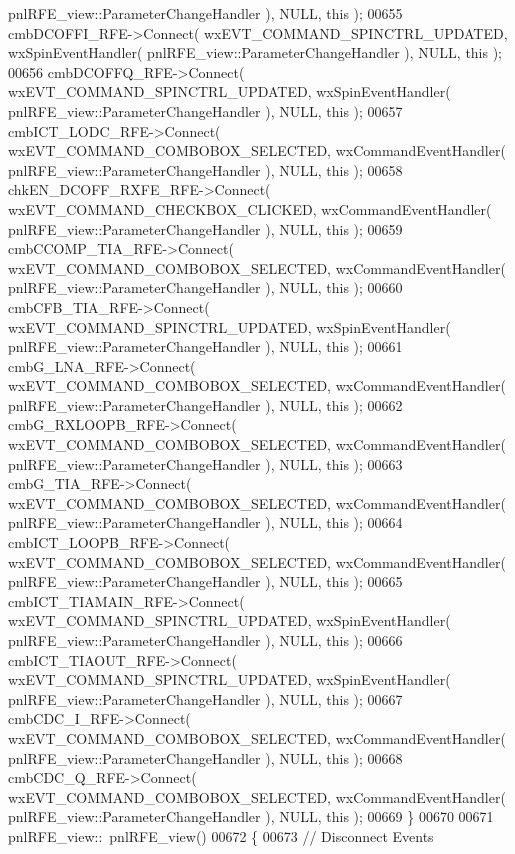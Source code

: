 \begin{DoxyCode}
      pnlRFE_view::ParameterChangeHandler ), NULL, \textcolor{keyword}{this} );
00655     cmbDCOFFI_RFE->Connect( wxEVT\_COMMAND\_SPINCTRL\_UPDATED, wxSpinEventHandler( 
      pnlRFE_view::ParameterChangeHandler ), NULL, \textcolor{keyword}{this} );
00656     cmbDCOFFQ_RFE->Connect( wxEVT\_COMMAND\_SPINCTRL\_UPDATED, wxSpinEventHandler( 
      pnlRFE_view::ParameterChangeHandler ), NULL, \textcolor{keyword}{this} );
00657     cmbICT_LODC_RFE->Connect( wxEVT\_COMMAND\_COMBOBOX\_SELECTED, wxCommandEventHandler( 
      pnlRFE_view::ParameterChangeHandler ), NULL, \textcolor{keyword}{this} );
00658     chkEN_DCOFF_RXFE_RFE->Connect( wxEVT\_COMMAND\_CHECKBOX\_CLICKED, wxCommandEventHandler( 
      pnlRFE_view::ParameterChangeHandler ), NULL, \textcolor{keyword}{this} );
00659     cmbCCOMP_TIA_RFE->Connect( wxEVT\_COMMAND\_COMBOBOX\_SELECTED, wxCommandEventHandler( 
      pnlRFE_view::ParameterChangeHandler ), NULL, \textcolor{keyword}{this} );
00660     cmbCFB_TIA_RFE->Connect( wxEVT\_COMMAND\_SPINCTRL\_UPDATED, wxSpinEventHandler( 
      pnlRFE_view::ParameterChangeHandler ), NULL, \textcolor{keyword}{this} );
00661     cmbG_LNA_RFE->Connect( wxEVT\_COMMAND\_COMBOBOX\_SELECTED, wxCommandEventHandler( 
      pnlRFE_view::ParameterChangeHandler ), NULL, \textcolor{keyword}{this} );
00662     cmbG_RXLOOPB_RFE->Connect( wxEVT\_COMMAND\_COMBOBOX\_SELECTED, wxCommandEventHandler( 
      pnlRFE_view::ParameterChangeHandler ), NULL, \textcolor{keyword}{this} );
00663     cmbG_TIA_RFE->Connect( wxEVT\_COMMAND\_COMBOBOX\_SELECTED, wxCommandEventHandler( 
      pnlRFE_view::ParameterChangeHandler ), NULL, \textcolor{keyword}{this} );
00664     cmbICT_LOOPB_RFE->Connect( wxEVT\_COMMAND\_COMBOBOX\_SELECTED, wxCommandEventHandler( 
      pnlRFE_view::ParameterChangeHandler ), NULL, \textcolor{keyword}{this} );
00665     cmbICT_TIAMAIN_RFE->Connect( wxEVT\_COMMAND\_SPINCTRL\_UPDATED, wxSpinEventHandler( 
      pnlRFE_view::ParameterChangeHandler ), NULL, \textcolor{keyword}{this} );
00666     cmbICT_TIAOUT_RFE->Connect( wxEVT\_COMMAND\_SPINCTRL\_UPDATED, wxSpinEventHandler( 
      pnlRFE_view::ParameterChangeHandler ), NULL, \textcolor{keyword}{this} );
00667     cmbCDC_I_RFE->Connect( wxEVT\_COMMAND\_COMBOBOX\_SELECTED, wxCommandEventHandler( 
      pnlRFE_view::ParameterChangeHandler ), NULL, \textcolor{keyword}{this} );
00668     cmbCDC_Q_RFE->Connect( wxEVT\_COMMAND\_COMBOBOX\_SELECTED, wxCommandEventHandler( 
      pnlRFE_view::ParameterChangeHandler ), NULL, \textcolor{keyword}{this} );
00669 \}
00670 
00671 pnlRFE_view::~pnlRFE_view()
00672 \{
00673     \textcolor{comment}{// Disconnect Events}

\end{DoxyCode}
